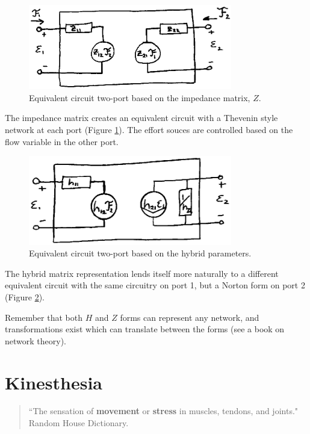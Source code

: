 %
\begin{figure}[h]	%
\centering \includegraphics[width=3.5in]{figs14/00310.eps}
\caption{Equivalent circuit two-port based on the impedance matrix, $Z$.}\label{ZEquivTwoPort}	%
\end{figure}	%


The impedance matrix creates an equivalent circuit with a Thevenin style network at each port (Figure \ref{ZEquivTwoPort}).  The effort souces are controlled based on the flow variable in the other port.	%

%
\begin{figure}[h]	%
\centering \includegraphics[width=3.5in]{figs14/00311.eps}
\caption{Equivalent circuit two-port based on the hybrid parameters.}\label{HEquivTwoPort}	%
\end{figure}	%


The hybrid matrix representation lends itself more naturally to a different equivalent circuit with the same circuitry on port 1, but a Norton form on port 2 (Figure \ref{HEquivTwoPort}).	%

Remember that both $H$ and $Z$ forms can represent any network, and transformations exist which can translate between the forms (see a book on network theory).




\section{Kinesthesia}
\begin{quotation}
\noindent
``The sensation of {\bf movement} or {\bf stress} in muscles, tendons, and joints."\\
Random House Dictionary.
\end{quotation}


